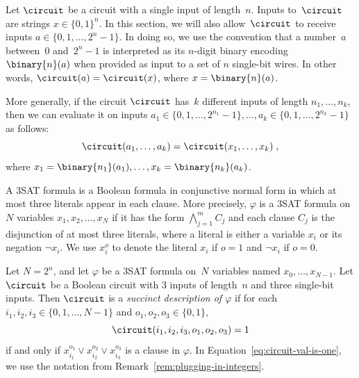 \begin{remark}\label{rem:plugging-in-integers}
  Let $\circuit$ be a circuit with a single input of length~$n$.
  Inputs to~$\circuit$ are strings $x \in \{0, 1\}^n$.
  In this section, we will also allow~$\circuit$ to receive inputs $a \in \{0,
  1, \ldots, 2^n-1\}$.
  In doing so, we use the convention that a number~$a$ between~$0$ and~$2^{n}-1$
  is interpreted as its $n$-digit binary encoding $\binary{n}(a)$
when provided as input to a set of
  $n$ single-bit wires.
  In other words, $\circuit(a) = \circuit(x)$, where $x = \binary{n}(a)$.

  More generally, if the circuit $\circuit$ has~$k$ different inputs of length
  $n_1, \ldots, n_k$, then we can evaluate it on inputs $a_1 \in \{0, 1, \ldots,
  2^{n_1}-1\}, \ldots, a_k \in \{0, 1, \ldots, 2^{n_k}-1\}$ as follows:
  \begin{equation*}
    \circuit(a_1, \ldots, a_k) = \circuit(x_1, \ldots, x_k)\;,
  \end{equation*}
  where $x_1 = \binary{n_1}(a_1), \ldots, x_k = \binary{n_k}(a_k)$.
\end{remark}

A 3SAT formula is a Boolean formula in conjunctive normal form in which at most
three literals appear in each clause.
More precisely, $\varphi$ is a 3SAT formula on $N$ variables $x_1, x_2, \ldots,
x_N$ if it has the form $\bigwedge_{j=1}^m C_j$ and each clause $C_j$ is the
disjunction of at most three literals, where a literal is either a variable
$x_i$ or its negation $\neg x_i$.
We use $x_i^o$ to denote the literal $x_i$ if $o = 1$ and $\neg x_i$ if $o = 0$.

\begin{definition}
  \label{def:succinct-formulas}
  Let $N = 2^n$, and let $\varphi$ be a 3SAT formula on~$N$ variables named
  $x_0, \ldots, x_{N-1}$.
  Let $\circuit$ be a Boolean circuit with 3 inputs of length~$n$ and three
  single-bit inputs.
  Then $\circuit$ is a \emph{succinct description of $\varphi$} if for each
  $i_1, i_2, i_3 \in \{0, 1, \ldots, N-1\}$ and $o_1, o_2, o_3 \in \{0, 1\}$,
  \begin{equation}\label{eq:circuit-val-is-one}
    \circuit(i_1, i_2, i_3, o_1, o_2, o_3) = 1
  \end{equation}
  if and only if $x_{i_1}^{o_1} \lor x_{i_2}^{o_2} \lor x_{i_3}^{o_3}$ is a
  clause in $\varphi$.
  In Equation~\eqref{eq:circuit-val-is-one}, we use the notation from
  Remark~\ref{rem:plugging-in-integers}.
\end{definition}
  
